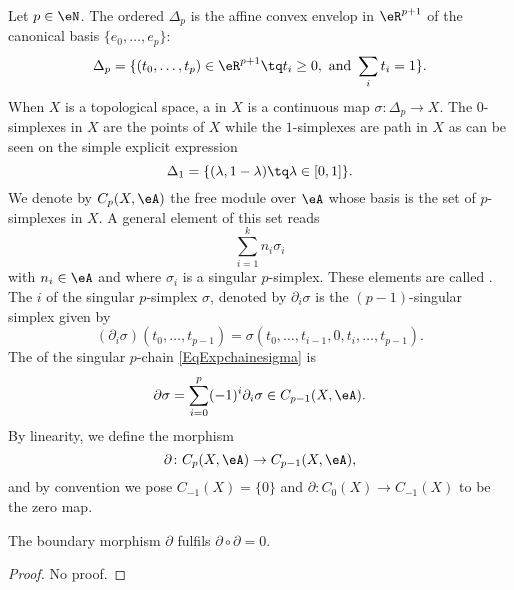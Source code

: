 Let $p\in\eN$. The ordered  $\Delta_p$ is the affine convex envelop in $\eR^{p+1}$ of the canonical basis $\{ e_0,\ldots,e_p \}$:
\begin{equation}
	\Delta_p=\{ (t_0,\ldots,t_p)\in\eR^{p+1}\tq t_i\geq 0,\text{ and }\sum_it_i=1 \}.
\end{equation}
When $X$ is a topological space, a  in $X$ is a continuous map $\sigma\colon \Delta_p\to X$. The $0$-simplexes in $X$ are the points of $X$ while the $1$-simplexes are path in $X$ as can be seen on the simple explicit expression
\[ 
  \Delta_1=\{ (\lambda,1-\lambda)\tq\lambda\in[0,1] \}.
\]
We denote by $C_p(X,\eA)$ the free module over $\eA$ whose basis is the set of $p$-simplexes in $X$. A general element of this set reads 
\begin{equation}		\label{EqExpchainesigma}
  \sum_{i=1}^kn_i\sigma_i
\end{equation}
with $n_i\in\eA$ and where $\sigma_i$ is a singular $p$-simplex. These elements are called . The  $i$ of the singular $p$-simplex $\sigma$, denoted by $\partial_i\sigma$ is the $(p-1)$-singular simplex given by
\[ 
  (\partial_i\sigma)(t_0,\ldots,t_{p-1})=\sigma(t_0,\ldots,t_{i-1},0,t_i,\ldots,t_{p-1}).
\]
The  of the singular $p$-chain \ref{EqExpchainesigma} is
\begin{equation}
	\partial\sigma=\sum_{i=0}^p(-1)^i\partial_i\sigma\in C_{p-1}(X,\eA).
\end{equation}
By linearity, we define the morphism
\begin{equation}
\partial\colon C_{p}(X,\eA)\to C_{p-1}(X,\eA),
\end{equation}
and by convention we pose $C_{-1}(X)=\{ 0 \}$ and $\partial\colon C_0(X)\to C_{-1}(X)$ to be the zero map.

\begin{lemma}
The boundary morphism $\partial$ fulfils $\partial\circ\partial =0$.
\end{lemma}

\begin{proof}
No proof.
\end{proof}

